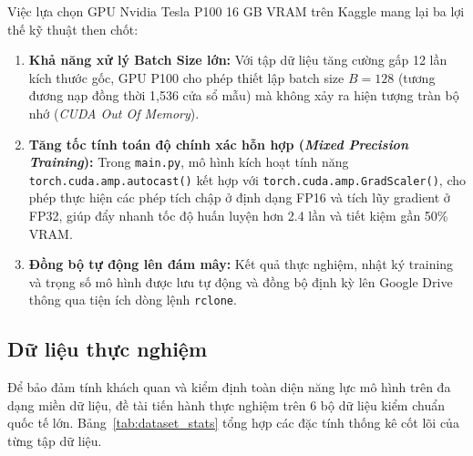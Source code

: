 \documentclass[sigconf,nonacm]{acmart}
\begin{document}
Việc lựa chọn GPU Nvidia Tesla P100 16 GB VRAM trên Kaggle mang lại ba lợi thế kỹ thuật then chốt:
\begin{enumerate}[leftmargin=*, itemsep=1pt, parsep=0pt]
    \item \textbf{Khả năng xử lý Batch Size lớn:} Với tập dữ liệu tăng cường gấp 12 lần kích thước gốc, GPU P100 cho phép thiết lập batch size $B=128$ (tương đương nạp đồng thời 1,536 cửa sổ mẫu) mà không xảy ra hiện tượng tràn bộ nhớ (\textit{CUDA Out Of Memory}).
    \item \textbf{Tăng tốc tính toán độ chính xác hỗn hợp (\textit{Mixed Precision Training}):} Trong \texttt{main.py}, mô hình kích hoạt tính năng \texttt{torch.cuda.amp.autocast()} kết hợp với \texttt{torch.cuda.amp.GradScaler()}, cho phép thực hiện các phép tích chập ở định dạng FP16 và tích lũy gradient ở FP32, giúp đẩy nhanh tốc độ huấn luyện hơn 2.4 lần và tiết kiệm gần 50\% VRAM.
    \item \textbf{Đồng bộ tự động lên đám mây:} Kết quả thực nghiệm, nhật ký training và trọng số mô hình được lưu tự động và đồng bộ định kỳ lên Google Drive thông qua tiện ích dòng lệnh \texttt{rclone}.
\end{enumerate}

\subsection{Dữ liệu thực nghiệm}

Để bảo đảm tính khách quan và kiểm định toàn diện năng lực mô hình trên đa dạng miền dữ liệu, đề tài tiến hành thực nghiệm trên 6 bộ dữ liệu kiểm chuẩn quốc tế lớn. Bảng~\ref{tab:dataset_stats} tổng hợp các đặc tính thống kê cốt lõi của từng tập dữ liệu.
\end{document}

